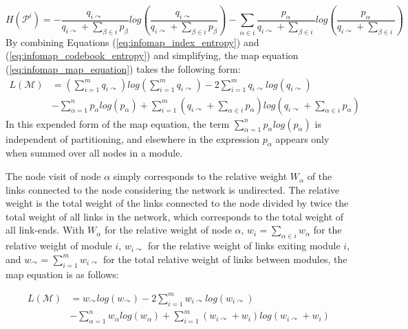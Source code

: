 \begin{equation}\label{eq:infomap_codebook_entropy}
H(\mathcal{P}^i) = - \dfrac{q_{i\curvearrowright}}{q_{i\curvearrowright} + \sum_{\beta \in i} p_\beta} log \left(\dfrac{q_{i\curvearrowright}}{q_{i\curvearrowright} + \sum_{\beta \in i} p_\beta}\right) - \sum_{\alpha \in i} \dfrac{p_\alpha}{q_{i\curvearrowright} + \sum_{\beta \in i}} log \left(\dfrac{p_\alpha}{q_{i\curvearrowright} + \sum_{\beta \in i}}\right)
\end{equation}
By combining Equations (\ref{eq:infomap_index_entropy}) and (\ref{eq:infomap_codebook_entropy}) and simplifying, the map equation (\ref{eq:infomap_map_equation}) takes the following form:
\begin{align}
L(\mathcal{M}) &= \left(\sum_{i=1}^{m} q_{i\curvearrowright}\right) log \left(\sum_{i=1}^{m} q_{i\curvearrowright}\right) - 2 \sum_{i=1}^{m} q_{i\curvearrowright} log (q_{i\curvearrowright}) \nonumber \\
&- \sum_{\alpha=1}^{n} p_\alpha log (p_\alpha) + \sum_{i=1}^{m} \left(q_{i\curvearrowright} + \sum_{\alpha \in i} p_\alpha\right) log \left(q_{i\curvearrowright} + \sum_{\alpha \in i} p_\alpha\right)
\end{align}
In this expended form of the map equation, the term $\sum_{\alpha=1}^{n} p_\alpha log (p_\alpha)$ is independent of partitioning, and elsewhere in the expression $p_\alpha$ appears only when summed over all nodes in a module.

The node visit of node $\alpha$ simply corresponds to the relative weight $W_\alpha$ of the links connected to the node considering the network is undirected. The relative weight is the total weight of the links connected to the node divided by twice the total weight of all links in the network, which corresponds to the total weight of all link-ends. With $W_\alpha$ for the relative weight of node $\alpha$, $w_i = \sum_{\alpha \in i}w_\alpha$ for the relative weight of module $i$, $w_{i\curvearrowright}$ for the relative weight of links exiting module $i$, and $w_{\curvearrowright} = \sum_{i=1}^{m} w_{i\curvearrowright}$ for the total relative weight of links between modules, the map equation is as follows:

\begin{align}
L(\mathcal{M}) &= w_{\curvearrowright} log(w_\curvearrowright) -2\sum_{i=1}^{m} w_{i\curvearrowright} log(w_{i\curvearrowright}) \nonumber \\ &- \sum_{\alpha=1}^{n} w_\alpha log(w_\alpha) + \sum_{i=1}^{m} (w_{i\curvearrowright} + w_i) log(w_{i\curvearrowright} + w_i)
\end{align}


